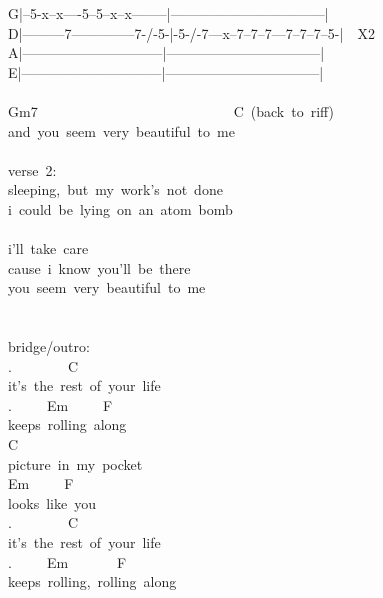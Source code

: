 {G|--5-x--x----5--5--x--x--------|---------------------------------|\\
D|---------7--------------7-/-5-|-5-/-7---x--7--7--7---7--7--7--5-|\ \ X2\\
A|------------------------------|---------------------------------|\\
E|------------------------------|---------------------------------|\\
\\
Gm7\ \ \ \ \ \ \ \ \ \ \ \ \ \ \ \ \ \ \ \ \ \ \ \ \ \ \ \ C\ (back\ to\ riff)\\
and\ you\ seem\ very\ beautiful\ to\ me\ \\
\\
verse\ 2:\\
sleeping,\ but\ my\ work's\ not\ done\\
i\ could\ be\ lying\ on\ an\ atom\ bomb\\
\\
i'll\ take\ care\\
cause\ i\ know\ you'll\ be\ there\ \\
you\ seem\ very\ beautiful\ to\ me\\
\\
\\
bridge/outro:\\
.\ \ \ \ \ \ \ \ C\\
it's\ the\ rest\ of\ your\ life\\
.\ \ \ \ \ Em\ \ \ \ \ F\\
keeps\ rolling\ along\\
C\ \ \ \ \\
picture\ in\ my\ pocket\\
Em\ \ \ \ \ F\\
looks\ like\ you\\
.\ \ \ \ \ \ \ \ C\\
it's\ the\ rest\ of\ your\ life\\
.\ \ \ \ \ Em\ \ \ \ \ \ \ F\\
keeps\ rolling,\ rolling\ along}

